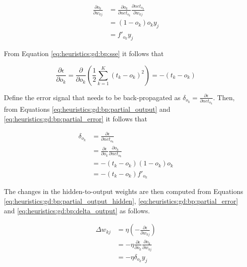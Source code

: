 \begin{equation}
      \label{eq:heuristics:gd:bp:partial_output_hidden}
      \begin{split}
            \frac{\partial o_{k}}{\partial w_{kj}}
            &= \frac{\partial o_{k}}{\partial net_{o_{k}}}\frac{\partial net_{o_{k}}}{\partial w_{kj}}\\
            &= (1 - o_{k})o_{k}y_{j}\\
            &= f'_{o_{k}}y_{j}
      \end{split}
\end{equation}

From Equation \ref{eq:heuristics:gd:bp:sse} it follows that

\begin{equation}
      \label{eq:heuristics:gd:bp:partial_error}
      \frac{\partial \epsilon}{\partial o_{k}} = \frac{\partial}{\partial o_{k}}\left( \frac{1}{2} \sum^{K}_{k=1}(t_{k} - o_{k})^{2} \right) = -(t_{k} - o_{k})
\end{equation}

Define the error signal that needs to be back-propagated as $\delta_{o_{k}} = \frac{\partial \epsilon}{\partial net_{o_{k}}}$. Then, from Equations \ref{eq:heuristics:gd:bp:partial_output} and \ref{eq:heuristics:gd:bp:partial_error} it follows that


\begin{equation}
      \label{eq:heuristics:gd:bp:delta_output}
      \begin{split}
            \delta_{o_{k}}
            &= \frac{\partial \epsilon}{\partial net_{o_{k}}}\\
            &= \frac{\partial \epsilon}{\partial o_{k}}\frac{\partial o_{k}}{\partial net_{o_{k}}}\\
            &= -(t_{k} - o_{k})(1 - o_{k})o_{k}\\
            &= -(t_{k} - o_{k})f'_{o_{k}}
      \end{split}
\end{equation}

The changes in the hidden-to-output weights are then computed from Equations \ref{eq:heuristics:gd:bp:partial_output_hidden}, \ref{eq:heuristics:gd:bp:partial_error} and \ref{eq:heuristics:gd:bp:delta_output} as follows.

\begin{equation}
      \label{eq:heuristics:gd:bp:delta_hidden_to_output}
      \begin{split}
            \Delta w_{kj}
            &= \eta \left( - \frac{\partial \epsilon}{\partial w_{kj}} \right)\\
            &= -\eta \frac{\partial \epsilon}{\partial o_{k}}\frac{\partial o_{k}}{\partial w_{kj}}\\
            &= -\eta \delta_{o_{k}}y_{j}
      \end{split}
\end{equation}

